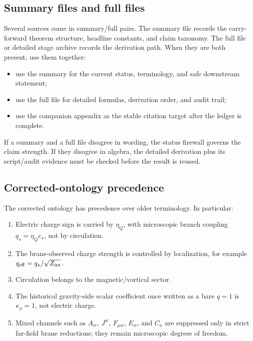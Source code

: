 \subsection{Summary files and full files}
\label{subsec:summary-files-and-full-files}

Several sources come in summary/full pairs.  The summary file records the carry-forward theorem structure, headline constants, and claim taxonomy.  The full file or detailed stage archive records the derivation path.  When they are both present, use them together:

\begin{itemize}[leftmargin=2.2em]
\item use the summary for the current status, terminology, and safe downstream statement;
\item use the full file for detailed formulas, derivation order, and audit trail;
\item use the companion appendix as the stable citation target after the ledger is complete.
\end{itemize}

If a summary and a full file disagree in wording, the status firewall governs the claim strength.  If they disagree in algebra, the detailed derivation plus its script/audit evidence must be checked before the result is reused.

\subsection{Corrected-ontology precedence}
\label{subsec:corrected-ontology-precedence}

The corrected ontology has precedence over older terminology.  In particular:

\begin{enumerate}[leftmargin=2.4em]
\item Electric charge sign is carried by \(\eta_Q\), with microscopic branch coupling \(q_\star=\eta_Q e_\star\), not by circulation.
\item The brane-observed charge strength is controlled by localization, for example \(q_{\rm eff}=q_\star/\sqrt{Z_{\rm int}}\).
\item Circulation belongs to the magnetic/vortical sector.
\item The historical gravity-side scalar coefficient once written as a bare \(q=1\) is \(\kappa_\rho=1\), not electric charge.
\item Mixed channels such as \(A_w\), \(J^w\), \(F_{\mu w}\), \(E_w\), and \(C_a\) are suppressed only in strict far-field brane reductions; they remain microscopic degrees of freedom.
\end{enumerate}

